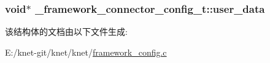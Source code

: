 \subsubsection[{user\+\_\+data}]{\setlength{\rightskip}{0pt plus 5cm}void$\ast$ \+\_\+framework\+\_\+connector\+\_\+config\+\_\+t\+::user\+\_\+data}\label{a00011_a7aeeb873603639bff576d88e43e52041_a7aeeb873603639bff576d88e43e52041}


该结构体的文档由以下文件生成\+:\begin{DoxyCompactItemize}
\item 
E\+:/knet-\/git/knet/knet/\hyperlink{a00070}{framework\+\_\+config.\+c}\end{DoxyCompactItemize}
